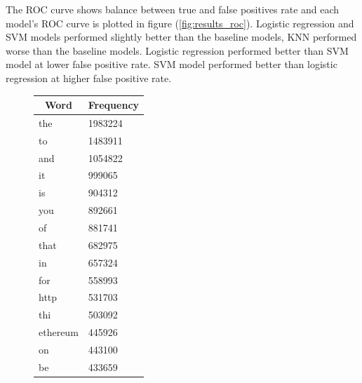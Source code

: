 \documentclass[transmag]{IEEEtran}
\begin{document}
\noindent The ROC curve shows balance between true and false positives rate and each model's ROC curve is plotted in figure (\ref{fig:results_roc}). Logistic regression and SVM models performed slightly better than the baseline models, KNN performed worse than the baseline models. Logistic regression performed better than SVM model at lower false positive rate. SVM model performed better than logistic regression at higher false positive rate.

\begin{figure}[h]
\begin{center}
\begin{tabular}{|l|l|}
\hline
\multicolumn{1}{|c|}{\textbf{Word}} & \multicolumn{1}{c|}{\textbf{Frequency}} \\ \hline
the                                 & 1983224                                 \\ \hline
to                                  & 1483911                                 \\ \hline
and                                 & 1054822                                 \\ \hline
it                                  & 999065                                  \\ \hline
is                                  & 904312                                  \\ \hline
you                                 & 892661                                  \\ \hline
of                                  & 881741                                  \\ \hline
that                                & 682975                                  \\ \hline
in                                  & 657324                                  \\ \hline
for                                 & 558993                                  \\ \hline
http                                & 531703                                  \\ \hline
thi                                 & 503092                                  \\ \hline
ethereum                            & 445926                                  \\ \hline
on                                  & 443100                                  \\ \hline
be                                  & 433659                                  \\ \hline

\end{tabular}
\end{center}
\end{figure}
\end{document}
